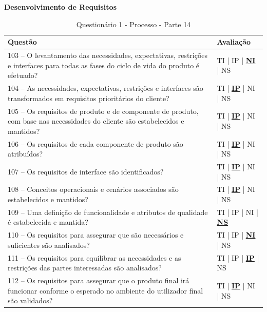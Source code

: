 \documentclass[openany,10pt,a4paper]{article}
\begin{document}
\begin{appendix}
	\begin{table}[h]
	\textbf{Desenvolvimento de Requisitos}
		\centering
		\caption{Questionário 1 - Processo - Parte 14}
		\begin{tabular}{p{5in}p{1in}}		
			\toprule
			\textbf{Questão}  & \textbf{Avaliação}\\ 
			\midrule
			103 – O levantamento das necessidades, expectativas, restrições e interfaces para todas as fases 
	do ciclo de vida do produto é efetuado?
	 & TI | IP | \underline{\textbf{NI}} | NS \\
			\midrule
			104 – As necessidades, expectativas, restrições e interfaces são transformados em requisitos 
	prioritários do cliente?
	 & TI | \underline{\textbf{IP}} | NI | NS \\
			\midrule
			105 – Os requisitos de produto e de componente de produto, com base nas necessidades do 
	cliente são estabelecidos e mantidos?
	 & TI | \underline{\textbf{IP}} | NI | NS \\
			\midrule
			106 – Os requisitos de cada componente de produto são atribuídos?
	 & TI | \underline{\textbf{IP}} | NI | NS \\
			\midrule
			107 – Os requisitos de interface são identificados?
	  & TI | \underline{\textbf{IP}} | NI | NS \\
			\midrule
			108 – Conceitos operacionais e cenários associados são estabelecidos e mantidos?
	 & TI | \underline{\textbf{IP}} | NI | NS \\
	 \midrule
			109 – Uma definição de funcionalidade e atributos de qualidade é estabelecida e mantida?
	 & TI | IP | NI | \underline{\textbf{NS}} \\
	 \midrule
		110 – Os requisitos para assegurar que são necessários e suficientes são analisados?
	 & TI | IP | \underline{\textbf{NI}} | NS \\
	 \midrule
			111 – Os requisitos para equilibrar as necessidades e as restrições das partes interessadas são 
	analisados?
	 & TI | IP | \underline{\textbf{IP}} | NS \\
			\midrule
			112 – Os requisitos para assegurar que o produto final irá funcionar conforme o esperado no 
	ambiente do utilizador final são validados?
	 & TI | \underline{\textbf{IP}} | NI | NS \\
			\bottomrule
		\end{tabular} 
	\end{table}
	

\end{appendix}
\end{document}
